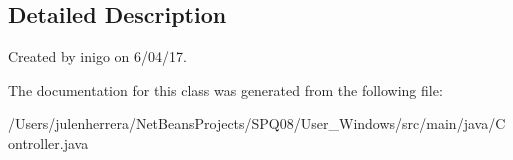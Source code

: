 \subsection{Detailed Description}
Created by inigo on 6/04/17. 

The documentation for this class was generated from the following file\+:\begin{DoxyCompactItemize}
\item 
/\+Users/julenherrera/\+Net\+Beans\+Projects/\+S\+P\+Q08/\+User\+\_\+\+Windows/src/main/java/Controller.\+java\end{DoxyCompactItemize}
